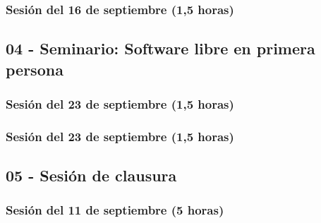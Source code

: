 \documentclass[a4paper,12pt]{article}
\begin{document}
\subsubsection{Sesión del 16 de septiembre (1,5 horas)}

\subsection{04 - Seminario: Software libre en primera persona}

\subsubsection{Sesión del 23 de septiembre (1,5 horas)}

\subsubsection{Sesión del 23 de septiembre (1,5 horas)}


\subsection{05 - Sesión de clausura}

\subsubsection{Sesión del 11 de septiembre (5 horas)}
\end{document}
